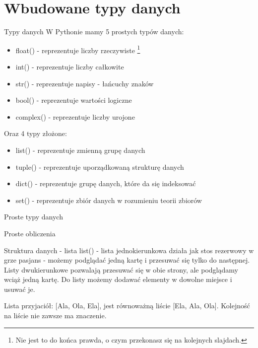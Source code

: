 
\section{Wbudowane typy danych}\label{sec:data_types}
\begin{frame}{Typy danych}
    W Pythonie mamy 5 prostych typów danych:
    \begin{itemize}
        \item float() - reprezentuje liczby rzeczywiste \footnote{Nie jest to do końca prawda, o czym przekonasz się na kolejnych slajdach.} \\
        \item int() - reprezentuje liczby całkowite \\
        \item str() - reprezentuje napisy - łańcuchy znaków \\
        \item bool() - reprezentuje wartości logiczne \\
        \item complex() - reprezentuje liczby urojone \\
    \end{itemize}
    Oraz 4 typy złożone:
    \begin{itemize}
        \item list() - reprezentuje zmienną grupę danych \\
        \item tuple() - reprezentuje uporządkowaną strukturę danych \\
        \item dict() - reprezentuje grupę danych, które da się indeksować \\
        \item set() - reprezentuje zbiór danych w rozumieniu teorii zbiorów \\
    \end{itemize}
\end{frame}
\begin{frame}{Proste typy danych}
    
\end{frame}
\begin{frame}{Proste obliczenia}
    
\end{frame}
\begin{frame}{Struktura danych - lista}
    list() - lista jednokierunkowa działa jak stos rezerwowy w grze pasjans - możemy
    podglądać jedną kartę i przesuwać się tylko do następnej. Listy dwukierunkowe
    pozwalają przesuwać się w obie strony, ale podglądamy wciąż jedną kartę. Do listy
    możemy dodawać elementy w dowolne miejsce i usuwać je.

    Lista przyjaciół: [Ala, Ola, Ela], jest równoważną liście [Ela, Ala, Ola].
    Kolejność na liście nie zawsze ma znaczenie.
\end{frame}
